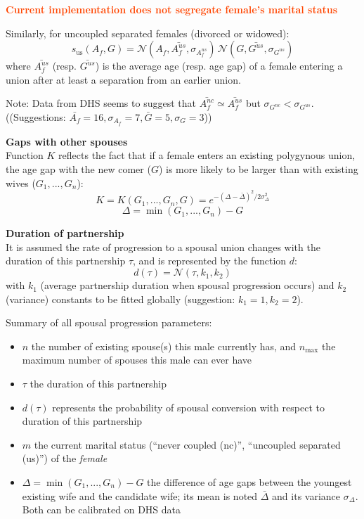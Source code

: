 \documentclass[11pt, onecolumn]{article}
\newcommand{\warning}[1]{\textbf{\textcolor{OrangeRed}{#1}}}
\begin{document}
\warning{Current implementation does not segregate female's marital status}

Similarly, for uncoupled separated females (divorced or widowed): 
$$ s_{\mathrm{us}}(A_f,G) = \mathcal{N}(A_f,\bar{A_f^{us}},\sigma_{A_f^{us}})\, \mathcal{N}(G,\bar{G^{us}},\sigma_{G^{us}}) $$
where $\bar{A_f^{us}}$ (resp. $\bar{G^{us}}$) is the average age (resp. age gap) of a female entering a union after at least a separation from an earlier union.

Note: Data from DHS seems to suggest that $\bar{A_f^{nc}} \simeq \bar{A_f^{us}}$ but $\sigma_{G^{nc}}<\sigma_{G^{us}}$. 
((Suggestions: $\bar{A_f}=16, \sigma_{A_f}=7, \bar{G}=5, \sigma_{G}=3$))

\textbf{Gaps with other spouses}\\
Function $K$ reflects the fact that if a female enters an existing polygynous union, the age gap with the new comer ($G$) is more likely to be larger than with existing wives ($G_1,...,G_n$):
$$K = K(G_{1},...,G_{n},G) = e^{-(\Delta-\bar{\Delta})^2/2\sigma_\Delta^2}$$ 
$$\Delta = \min(G_1,...,G_n)-G$$

\textbf{Duration of partnership}\\
It is assumed the rate of progression to a spousal union changes with the duration of this partnership $\tau$, and is represented by the function $d$:
$$d(\tau) =  \mathcal{N}(\tau,k_1,k_2)$$
with $k_1$ (average partnership duration when spousal progression occurs) and $k_2$ (variance) constants to be fitted globally (suggestion: $k_1=1, k_2=2$).

Summary of all spousal progression parameters:
\begin{itemize}
\item $n$ the number of existing spouse(s) this male currently has, and $n_{\mathrm{max}}$ the maximum number of spouses this male can ever have
\item $\tau$ the duration of this partnership
\item $d(\tau)$ represents the probability of spousal conversion with respect to duration of this partnership
\item $m$ the current marital status (``never coupled (nc)'', ``uncoupled separated (us)'') of the \emph{female}
\item $\Delta = \min(G_1,...,G_n)-G$ the difference of age gaps between the youngest existing wife and the candidate wife; its mean is noted $\bar{\Delta}$ and its variance $\sigma_\Delta$. Both can be calibrated on DHS data
\end{itemize}
\end{document}
